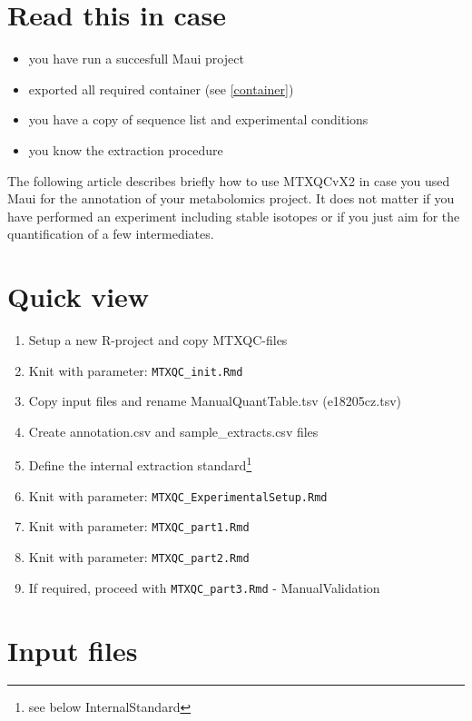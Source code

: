 \documentclass[]{book}
\providecommand{\tightlist}{%
  \setlength{\itemsep}{0pt}\setlength{\parskip}{0pt}}
\let\rmarkdownfootnote\footnote%
\def\footnote{\protect\rmarkdownfootnote}
\theoremstyle{definition}
\theoremstyle{definition}
\theoremstyle{definition}
\theoremstyle{remark}
\begin{document}
\section{Read this in case}\label{read-this-in-case}

\begin{itemize}
\tightlist
\item
  you have run a succesfull Maui project
\item
  exported all required container (see \ref{container})
\item
  you have a copy of sequence list and experimental conditions
\item
  you know the extraction procedure
\end{itemize}

The following article describes briefly how to use MTXQCvX2 in case you
used Maui for the annotation of your metabolomics project. It does not
matter if you have performed an experiment including stable isotopes or
if you just aim for the quantification of a few intermediates.

\section{Quick view}\label{quick-view}

\begin{enumerate}
\def\labelenumi{\arabic{enumi}.}
\tightlist
\item
  Setup a new R-project and copy MTXQC-files
\item
  Knit with parameter: \texttt{MTXQC\_init.Rmd}
\item
  Copy input files and rename ManualQuantTable.tsv (e18205cz.tsv)
\item
  Create annotation.csv and sample\_extracts.csv files
\item
  Define the internal extraction standard\footnote{see below
    InternalStandard}
\item
  Knit with parameter: \texttt{MTXQC\_ExperimentalSetup.Rmd}
\item
  Knit with parameter: \texttt{MTXQC\_part1.Rmd}
\item
  Knit with parameter: \texttt{MTXQC\_part2.Rmd}
\item
  If required, proceed with \texttt{MTXQC\_part3.Rmd} - ManualValidation
\end{enumerate}

\section{Input files}\label{input-files}
\end{document}
